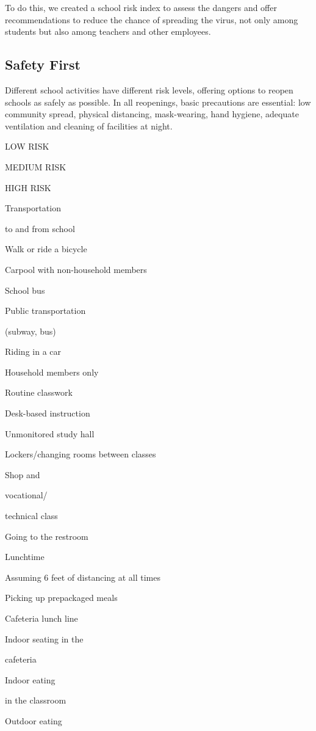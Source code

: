 To do this, we created a school risk index to assess the dangers and
offer recommendations to reduce the chance of spreading the virus, not
only among students but also among teachers and other employees.

\hypertarget{safety-first}{%
\subsection{Safety First}\label{safety-first}}

Different school activities have different risk levels, offering options
to reopen schools as safely as possible. In all reopenings, basic
precautions are essential: low community spread, physical distancing,
mask-wearing, hand hygiene, adequate ventilation and cleaning of
facilities at night.

LOW RISK

MEDIUM RISK

HIGH RISK

Transportation

to and from school

Walk or ride a bicycle

Carpool with non-household members

School bus

Public transportation

(subway, bus)

Riding in a car

Household members only

Routine classwork

Desk-based instruction

Unmonitored study hall

Lockers/changing rooms between classes

Shop and

vocational/

technical class

Going to the restroom

Lunchtime

Assuming 6 feet of distancing at all times

Picking up prepackaged meals

Cafeteria lunch line

Indoor seating in the

cafeteria

Indoor eating

in the classroom

Outdoor eating

